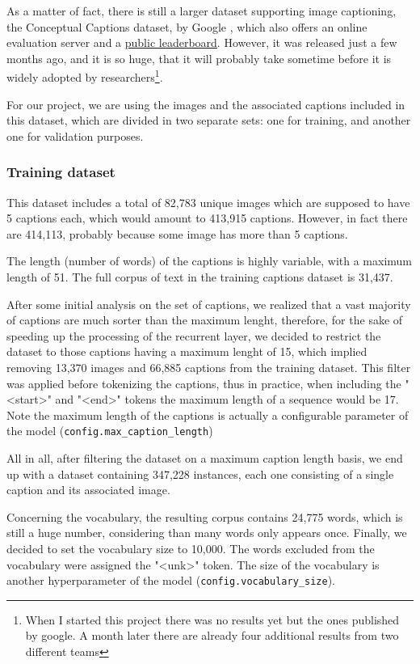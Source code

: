 As a matter of fact, there is still a larger dataset supporting image captioning, the Conceptual Captions dataset, by Google  \citep{Sharma2018}, which also offers an online evaluation server and a \href{https://ai.google.com/research/ConceptualCaptions/leaderboard?active_tab=leaderboard}{public leaderboard}. However, it was released just a few months ago, and it is so huge, that it will probably take sometime before it is widely adopted by researchers\footnote{When I started this project there was no results yet but the ones published by google. A month later there are already four additional results from two different teams}.

For our project, we are using the images and the associated captions included in this dataset, which are divided in two separate sets: one for training, and another one for validation purposes.

\subsubsection{Training dataset}

This dataset includes a total of 82,783 unique images which are supposed to have 5 captions each, which would amount to 413,915 captions. However, in fact there are 414,113, probably because some image has more than 5 captions.

The length (number of words) of the captions is highly variable, with a maximum length of 51. The full corpus of text in the training captions dataset is 31,437.

After some initial analysis on the set of captions, we realized that a vast majority of captions are much sorter than the maximum lenght, therefore, for the sake of speeding up the processing of the recurrent layer, we decided to restrict the dataset to those captions having a maximum lenght of 15, which implied removing  13,370 images and 66,885 captions from the training dataset. This filter was applied before tokenizing the captions, thus in practice, when including the "<start>" and "<end>" tokens the maximum length of a sequence would be 17. Note the maximum length of the captions is actually a configurable parameter of the model (\lstinline{config.max_caption_length})

All in all, after filtering the dataset on a maximum caption length basis, we end up with a dataset containing 347,228 instances, each one consisting of a single caption and its associated image.

Concerning the vocabulary, the resulting corpus contains 24,775 words, which is still a huge number, considering than many words only appears once. Finally, we decided to set the vocabulary size to 10,000. The words excluded from the vocabulary were assigned the "<unk>" token. The size of the vocabulary is another hyperparameter of the model (\lstinline{config.vocabulary_size}).

